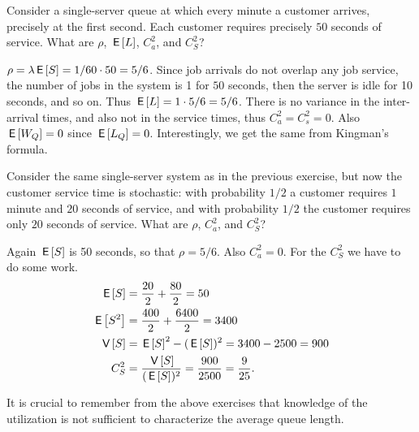 \begin{exercise}
 Consider a single-server queue at which every minute a
    customer arrives, precisely at the first second. Each customer
    requires precisely $50$ seconds of service. 
What are $\rho$,
    $\,\mathsf{E}\left[L\right]$, $C_a^2$, and $C_S^2$?
  \begin{solution}
 $\rho = \lambda \,\mathsf{E}\left[S\right] = 1/60 \cdot 50 = 5/6$. Since job
      arrivals do not overlap any job service, the number of jobs in
      the system is 1 for $50$ seconds, then the server is idle for 10
      seconds, and so on. Thus $\,\mathsf{E}\left[L\right] = 1\cdot5/6 = 5/6$. There is no
      variance in the inter-arrival times, and also not in the service
      times, thus $C_a^2 = C_s^2 = 0$. Also $\,\mathsf{E}\left[W_Q\right]=0$ since
      $\,\mathsf{E}\left[L_Q\right]=0$. Interestingly, we get the same from Kingman's formula.
  \end{solution}
\end{exercise}

\begin{exercise}
 Consider the same single-server system as in the previous exercise, but now the customer
    service time is stochastic: with probability $1/2$ a customer
    requires $1$ minute and $20$ seconds of service, and with
    probability $1/2$ the customer requires only $20$ seconds of
    service.  What are $\rho$, $C_a^2$, and $C_S^2$?
  \begin{solution}
 Again $\,\mathsf{E}\left[S\right]$ is 50 seconds, so that $\rho = 5/6$. Also
      $C_a^2=0$. For the $C_S^2$ we have to do some work. 
      \begin{equation*}
        \begin{split}
          \,\mathsf{E}\left[S\right] &=  \frac{20}2 + \frac{80}2 = 50 \\
          \,\mathsf{E}\left[S^2\right] &=  \frac{400}2 + \frac{6400} 2 = 3400 \\
          \,\mathsf{V}\left[S\right] &=  \,\mathsf{E}\left[S\right]^2 - (\,\mathsf{E}\left[S\right])^2 = 3400 - 2500 = 900 \\
          C_S^2 &=  \frac{\,\mathsf{V}\left[S\right]}{(\,\mathsf{E}\left[S\right])^2} = \frac{900}{2500}=\frac{9}{25}.
        \end{split}
      \end{equation*}
  \end{solution}
\end{exercise}

It is crucial to remember from the above exercises that knowledge of the   utilization is not sufficient to characterize the average queue   length.

